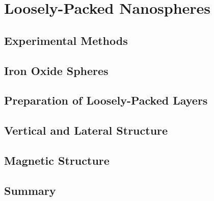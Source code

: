\documentclass[\main/dresen_thesis.tex]{subfiles}
\renewcommand{\thisPath}{\main/chapters/looselyPackedNS}
\begin{document}
  \chapter{Loosely-Packed Nanospheres}\label{ch:looselyPackedNS}
    
      \FloatBarrier
      \clearpage

    \section{Experimental Methods}
      
        \FloatBarrier
        \clearpage

    \section{Iron Oxide Spheres}\label{sec:looselyPackedNP:sphericalIronOxideNP}
      
        \FloatBarrier
        \clearpage

    \section{Preparation of Loosely-Packed Layers}
      
      \FloatBarrier
        \clearpage

    \section{Vertical and Lateral Structure}
      
      \FloatBarrier
        \clearpage

    \section{Magnetic Structure}
      \FloatBarrier
        \clearpage

    \section{Summary}
      
      \FloatBarrier
\end{document}
